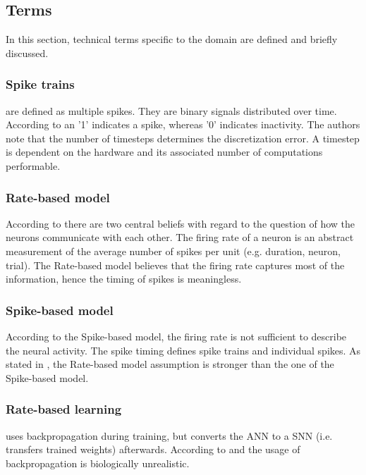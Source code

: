 \newcommand\rbModel{Rate-based model}
\newcommand\sbModel{Spike-based model}
\subsection{Terms}
\label{subsec:terms}

In this section, technical terms specific to the domain are defined and briefly discussed.

\subsubsection{Spike trains}
are defined as multiple spikes.
They are binary signals distributed over time.
According to \cite{DIET_SNN} an '1' indicates a spike, whereas '0' indicates inactivity.
The authors note that the number of timesteps determines the discretization error.
A timestep is dependent on the hardware and its associated number of computations performable.

\subsubsection{\rbModel{}}
According to \cite{spike_vs_rate} there are two central beliefs with regard to the question of how the neurons communicate with each other.
The firing rate of a neuron is an abstract measurement of the average number of spikes per unit (e.g. duration, neuron, trial).
The \rbModel{} believes that the firing rate captures most of the information, hence the timing of spikes is meaningless.

\subsubsection{\sbModel{}}
According to the \sbModel{}, the firing rate is not sufficient to describe the neural activity.
The spike timing defines spike trains and individual spikes.
As stated in \cite{spike_vs_rate}, the \rbModel{} assumption is stronger than the one of the \sbModel{}.

\subsubsection{Rate-based learning} uses backpropagation during training, but converts the \ac{ANN} to a \ac{SNN} (i.e. transfers trained weights) afterwards. 
According to \cite{SNN} and \cite{STDP_like} the usage of backpropagation is biologically unrealistic.
